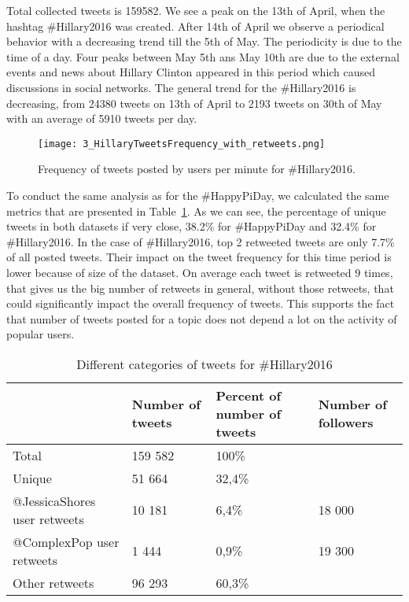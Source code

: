 \documentclass[journal, a4paper, 12pt]{article}
\begin{document}
Total collected tweets is 159582. We see a peak on the 13th of April, when the hashtag \#Hillary2016 was created. After 14th of April we observe a periodical behavior with a decreasing trend till the 5th of May. The periodicity is due to the time of a day. Four peaks between May 5th ans May 10th are due to the external events and news about Hillary Clinton appeared in this period which caused discussions in social networks. The general trend for the \#Hillary2016 is decreasing, from 24380 tweets on 13th of April to 2193 tweets on 30th of May with an average of 5910 tweets per day. \\

    
    	\begin{figure}[!hbt]
		\begin{center}
		\texttt{[image: 3\_HillaryTweetsFrequency\_with\_retweets.png]}
		\caption{Frequency of tweets posted by users per minute for \#Hillary2016.}
		\label{fig:hillary_freq_tweets}
		\end{center}
	\end{figure}
    
To conduct the same analysis as for the \#HappyPiDay, we calculated the same metrics that are presented in Table~\ref{tab:numberoftweets_hillary}. As we can see, the percentage of unique tweets in both datasets if very close, 38.2\% for \#HappyPiDay and 32.4\% for \#Hillary2016. In the case of \#Hillary2016, top 2 retweeted tweets are only 7.7\% of all posted tweets. Their impact on the tweet frequency for this time period is lower because of size of the dataset. On average each tweet is retweeted 9 times, that gives us the big number of retweets in general, without those retweets, that could significantly impact the overall frequency of tweets. This supports the fact that number of tweets posted for a topic does not depend a lot on the activity of popular users.
      
    \begin{table}[!hbt]
		\begin{center}
		\caption{Different categories of tweets for \#Hillary2016}
		\label{tab:numberoftweets_hillary}
		\begin{tabular}{|p{4cm}|p{2cm}|p{2cm}|p{2cm}|}
			\hline
			 & Number of tweets & Percent of number of tweets & Number of followers \\
            \hline
			Total & 159 582 & 100\% & \\
			\hline
			Unique & 51 664  &  32,4\%  & \\
			\hline
			@JessicaShores user retweets & 10 181 & 6,4\% & 18 000\\
            \hline
            @ComplexPop user retweets & 1 444 & 0,9\% & 19 300\\
			\hline
            Other retweets & 96 293 & 60,3\% &\\
			\hline
		\end{tabular}
		\end{center}
	\end{table}
    
\end{document}
